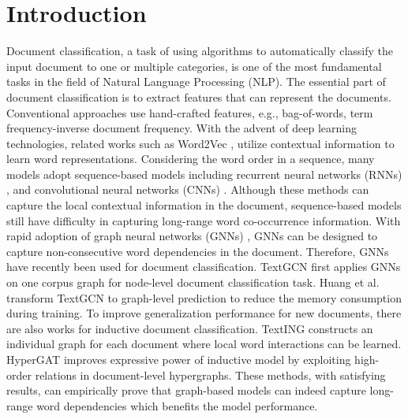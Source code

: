 \documentclass[letterpaper]{article} %
\begin{document}
\section{Introduction}
Document classification, a task of using algorithms to automatically classify the input document to one or multiple categories, is one of the most fundamental tasks in the field of Natural Language Processing (NLP).
The essential part of document classification is to extract features that can represent the documents.
Conventional approaches use hand-crafted features, e.g., bag-of-words, term frequency-inverse document frequency.
With the advent of deep learning technologies, related works such as Word2Vec \cite{mikolov2013distributed}, utilize contextual information to learn word representations.
Considering the word order in a sequence, many models adopt sequence-based models including recurrent neural networks (RNNs) \cite{mikolov2010recurrent, tai2015improved, liu2016recurrent}, and convolutional neural networks (CNNs) \cite{kim-2014-convolutional, zhang2015character}.
Although these methods can capture the local contextual information in the document, sequence-based models still have difficulty in capturing long-range word co-occurrence information.
With rapid adoption of graph neural networks (GNNs) \cite{kipf2017semi}, GNNs can be designed to capture non-consecutive word dependencies in the document. Therefore, GNNs have recently been used for document classification.
TextGCN \cite{yao2019graph} first applies GNNs on one corpus graph for node-level document classification task.
Huang et al. \cite{huang2019text} transform TextGCN to graph-level prediction to reduce the memory consumption during training.
To improve generalization performance for new documents, there are also works for inductive document classification. TextING \cite{zhang2020every} constructs an individual graph for each document where local word interactions can be learned. HyperGAT \cite{ding2020more} improves expressive power of inductive model by exploiting high-order relations in document-level hypergraphs.
These methods, with satisfying results, can empirically prove that graph-based models can indeed capture long-range word dependencies which benefits the model performance.
\end{document}
